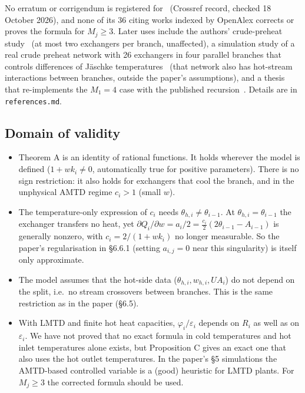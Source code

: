\documentclass[11pt,a4paper]{report}
\begin{document}
No erratum or corrigendum is registered for~\autocite{JS14} (Crossref record, checked 18 October 2026), and none of its
36 citing works indexed by OpenAlex corrects or proves the formula for \(M_j \ge 3\). Later uses include the authors'
crude-preheat study~\autocite{JS14escape} (at most two exchangers per branch, unaffected), a simulation study of a real
crude preheat network with 26 exchangers in four parallel branches that controls differences of Jäschke
temperatures~\autocite{Trafczynski2018} (that network also has hot-stream interactions between branches, outside the
paper's assumptions), and a thesis that re-implements the \(M_1 = 4\) case with
the published recursion~\autocite{Ikarimoto2019}. Details are in \texttt{references.md}.

\subsection{Domain of validity}

\begin{itemize}
\item Theorem A is an identity of rational functions. It holds wherever the model is defined (\(1 + wk_i \ne 0\),
automatically true for positive parameters). There is no sign restriction: it also holds for exchangers that cool the
branch, and in the unphysical AMTD regime \(c_i > 1\) (small \(w\)).
\item The temperature-only expression of \(c_i\) needs \(\theta_{h,i} \ne \theta_{i-1}\). At
\(\theta_{h,i} = \theta_{i-1}\) the exchanger transfers no heat, yet
\(\partial Q_i/\partial w = a_i/2 = \tfrac{c_i}{2}(2\theta_{i-1} - A_{i-1})\) is generally nonzero, with
\(c_i = 2/(1+wk_i)\) no longer measurable. So the paper's regularisation in §6.6.1 (setting \(a_{i,j} = 0\) near this
singularity) is itself only approximate.
\item The model assumes that the hot-side data (\(\theta_{h,i}, w_{h,i}, UA_i\)) do not depend on the split, i.e.~no
stream crossovers between branches. This is the same restriction as in the paper (§6.5).
\item With LMTD and finite hot heat capacities, \(\varphi_i/\varepsilon_i\) depends on \(R_i\) as well as on
\(\varepsilon_i\). We have not proved that no exact formula in cold temperatures and hot inlet temperatures alone
exists, but Proposition C gives an exact one that also uses the hot outlet temperatures. In the paper's §5 simulations
the AMTD-based controlled variable is a (good) heuristic for LMTD plants. For \(M_j \ge 3\) the corrected formula should
be used.
\end{itemize}
\end{document}
